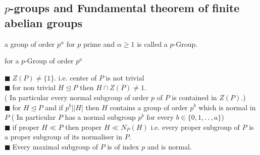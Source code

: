 \documentclass[11pt]{extarticle}
\newcommand{\ck}{.\,.\,}
\newcommand{\snote}[1]{{\footnotesize(#1)}}
\newcommand{\y}{$\blacksquare\;$}
\newcommand{\tbx}[2][]{
	\begin{tcolorbox}[enhanced,breakable,size=small,colback=black!2!white,title={#1},arc is angular, arc=1.5mm,drop fuzzy shadow]
		#2
	\end{tcolorbox}
}
\begin{document}
\begin{multicols}{2}
	\subsection{$ p $-groups and Fundamental theorem of finite abelian groups}
	
	\tbx{a group of order $ p^\alpha $ for $ p $ prime and $ \alpha \geq 1 $ is called a $ p $-Group.
	}
	\tbx{for a $ p $-Group of order $ p^a $ 
		
		\y  $ Z(P) \neq \{1 \}.$ i.e. center of $ P $ is not trivial \\
		\y  for non trivial $ H \trianglelefteq P $ then $ H \cap Z(P) \neq 1 .$ \\ 
		\snote{ In particular every normal subgroup of order $ p $ of $ P $ is contained in $ Z(P) .$}\\
		\y  for $ H \trianglelefteq P $ and if $ p^b | |H| $ then $ H $ contains a group of order $ p^b $ which is normal in $ P $ \snote{ In particular $ P $ has a normal subgroup $ p^b $ for every $b \in \{0,1,\ck , a\} $} \\
		\y  if proper $ H \ll  P $ then proper $ H \ll N_P(H) $ i.e. every proper subgroup of $ P $ is a proper subgroup of its normaliser in $ P .$ \\
		\y  Every maximal subgroup of $ P $ is of index $ p $  and is normal. 
		
}
\end{multicols}
\end{document}
